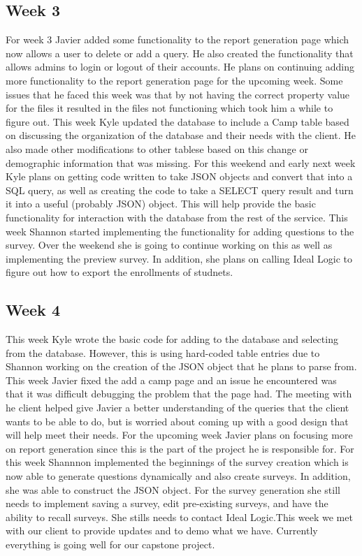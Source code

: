 \documentclass[letterpaper,10pt,serif, draftclsnofoot,onecolumn, compsoc, titlepage]{IEEEtran}
\begin{document}
\subsection{Week 3}
For week 3 Javier added some functionality to the report generation page which now allows a user to delete or add a query. He also created the functionality that allows admins to login or logout of their accounts. He plans on continuing adding more functionality to the report generation page for the upcoming week. Some issues that he faced this week was that by not having the correct property value for the files it resulted in the files not functioning which took him a while to figure out. This week Kyle updated the database to include a Camp table based on discussing the organization of the database and their needs with the client. He also made other modifications to other tablese based on this change or demographic information that was missing. For this weekend and early next week Kyle plans on getting code written to take JSON objects and convert that into a SQL query, as well as creating the code to take a SELECT query result and turn it into a useful (probably JSON) object. This will help provide the basic functionality for interaction with the database from the rest of the service. This week Shannon started implementing the functionality for adding questions to the survey. Over the weekend she is going to continue working on this as well as implementing the preview survey. In addition, she plans on calling Ideal Logic to figure out how to export the enrollments of studnets. 

\subsection{Week 4}
This week Kyle wrote the basic code for adding to the database and selecting from the database. However, this is using hard-coded table entries due to Shannon working on the creation of the JSON object that he plans to parse from. This week Javier fixed the add a camp page and an issue he encountered was that it was difficult debugging the problem that the page had. The meeting with he client helped give Javier a better understanding of the queries that the client wants to be able to do, but is worried about coming up with a good design that will help meet their needs. For the upcoming week Javier plans on focusing more on report generation since this is the part of the project he is responsible for. For this week Shannnon implemented the beginnings of the survey creation which is now able to generate questions dynamically and also create surveys. In addition, she was able to construct the JSON object. For the survey generation she still needs to implement saving a survey, edit pre-existing surveys, and have the ability to recall surveys. She stills needs to contact Ideal Logic.This week we met with our client to provide updates and to demo what we have. Currently everything is going well for our capstone project. 
\end{document}
